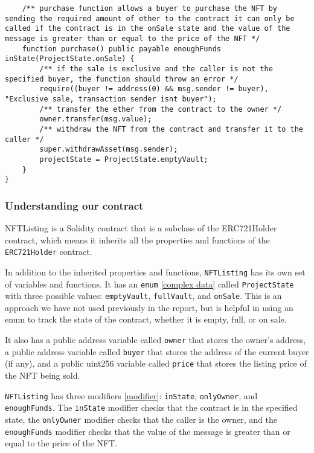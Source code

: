 \documentclass{article}
\theoremstyle{theorem}
\theoremstyle{definition}
\theoremstyle{remark}
\begin{document}
\begin{itemize}
\begin{lstlisting}
    /** purchase function allows a buyer to purchase the NFT by sending the required amount of ether to the contract it can only be called if the contract is in the onSale state and the value of the message is greater than or equal to the price of the NFT */
    function purchase() public payable enoughFunds inState(ProjectState.onSale) {
        /** if the sale is exclusive and the caller is not the specified buyer, the function should throw an error */
        require((buyer != address(0) && msg.sender != buyer), "Exclusive sale, transaction sender isnt buyer");    
        /** transfer the ether from the contract to the owner */
        owner.transfer(msg.value);
        /** withdraw the NFT from the contract and transfer it to the caller */
        super.withdrawAsset(msg.sender);
        projectState = ProjectState.emptyVault;
    }
}
\end{lstlisting}
\end{itemize}

\subsubsection{Understanding our contract} 

\medskip\noindent
\colorbox{Gainsboro!60!Lavender}{NFTListing} is a Solidity contract that is a subclass of the \colorbox{Gainsboro!60!Lavender}{ERC721Holder} contract, which means it inherits all the properties and functions of the \texttt{ERC721Holder} contract.

\medskip\noindent
In addition to the inherited properties and functions, \texttt{NFTListing} has its own set of variables and functions. It has an \texttt{enum} \ref{complex data} called \texttt{ProjectState} with three possible values: \texttt{emptyVault}, \texttt{fullVault}, and \texttt{onSale}. This is an approach we have not used previously in the report, but is helpful in using an enum to track the state of the contract, whether it is empty, full, or on sale.

\medskip\noindent
It also has a public address variable called \texttt{owner} that stores the owner's address, a public address variable called \texttt{buyer} that stores the address of the current buyer (if any), and a public uint256 variable called \texttt{price} that stores the listing price of the NFT being sold.

\medskip\noindent
\texttt{NFTListing} has three modifiers \ref{modifier}: \texttt{inState}, \texttt{onlyOwner}, and \texttt{enoughFunds}. The \texttt{inState} modifier checks that the contract is in the specified state, the \texttt{onlyOwner} modifier checks that the caller is the owner, and the \texttt{enoughFunds} modifier checks that the value of the message is greater than or equal to the price of the NFT.
\end{document}
